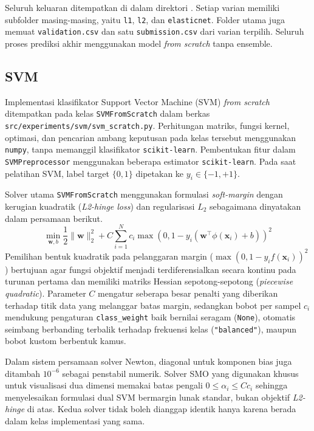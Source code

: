 Seluruh keluaran ditempatkan di dalam direktori . Setiap varian memiliki subfolder masing-masing, yaitu \texttt{l1}, \texttt{l2}, dan \texttt{elasticnet}. Folder utama juga memuat \texttt{validation.csv} dan satu \texttt{submission.csv} dari varian terpilih. Seluruh proses prediksi akhir menggunakan model \textit{from scratch} tanpa ensemble.

\subsection{SVM}

Implementasi klasifikator Support Vector Machine (SVM) \textit{from scratch} ditempatkan pada kelas \texttt{SVMFromScratch} dalam berkas \texttt{src/experiments/svm/svm\_scratch.py}. Perhitungan matriks, fungsi kernel, optimasi, dan pencarian ambang keputusan pada kelas tersebut menggunakan \texttt{numpy}, tanpa memanggil klasifikator \texttt{scikit-learn}. Pembentukan fitur dalam \texttt{SVMPreprocessor} menggunakan beberapa estimator \texttt{scikit-learn}. Pada saat pelatihan SVM, label target $\{0, 1\}$ dipetakan ke $y_i \in \{-1, +1\}$.

Solver utama \texttt{SVMFromScratch} menggunakan formulasi \textit{soft-margin} dengan kerugian kuadratik (\textit{L2-hinge loss}) dan regularisasi $L_2$ sebagaimana dinyatakan dalam persamaan berikut.
\begin{equation}
    \min_{\mathbf{w}, b} \frac{1}{2}\|\mathbf{w}\|_2^2 + C \sum_{i=1}^{N} c_i \max\left(0, 1 - y_i (\mathbf{w}^\top \phi(\mathbf{x}_i) + b)\right)^2
\end{equation}
Pemilihan bentuk kuadratik pada pelanggaran margin ($\max(0, 1 - y_i f(\mathbf{x}_i))^2$) bertujuan agar fungsi objektif menjadi terdiferensialkan secara kontinu pada turunan pertama dan memiliki matriks Hessian sepotong-sepotong (\textit{piecewise quadratic}). Parameter $C$ mengatur seberapa besar penalti yang diberikan terhadap titik data yang melanggar batas margin, sedangkan bobot per sampel $c_i$ mendukung pengaturan \texttt{class\_weight} baik bernilai seragam (\texttt{None}), otomatis seimbang berbanding terbalik terhadap frekuensi kelas (\texttt{"balanced"}), maupun bobot kustom berbentuk kamus.

Dalam sistem persamaan solver Newton, diagonal untuk komponen bias juga ditambah $10^{-6}$ sebagai penstabil numerik. Solver SMO yang digunakan khusus untuk visualisasi dua dimensi memakai batas pengali $0 \leq \alpha_i \leq Cc_i$ sehingga menyelesaikan formulasi dual SVM bermargin lunak standar, bukan objektif \textit{L2-hinge} di atas. Kedua solver tidak boleh dianggap identik hanya karena berada dalam kelas implementasi yang sama.

